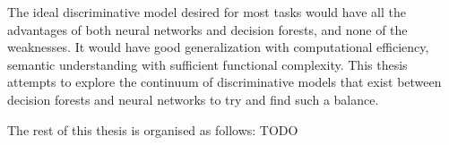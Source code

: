 The ideal discriminative model desired for most tasks would have all the advantages of both neural networks and decision forests, and none of the weaknesses. It would have good generalization with computational efficiency, semantic understanding with sufficient functional complexity. This thesis attempts to explore the continuum of discriminative models that exist between decision forests and neural networks to try and find such a balance.

The rest of this thesis is organised as follows: TODO

